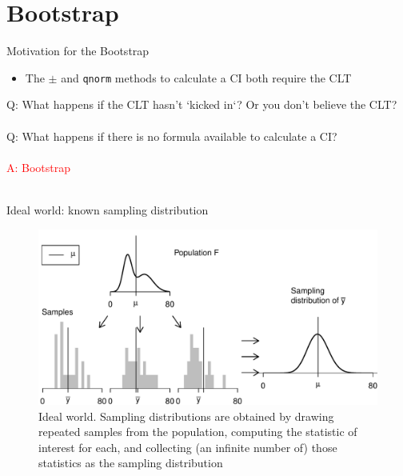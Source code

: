 \documentclass[10pt]{beamer}\usepackage[]{graphicx}\usepackage[]{color}
\makeatletter
\def\maxwidth{ %
  \ifdim\Gin@nat@width>\linewidth
    \linewidth
  \else
    \Gin@nat@width
  \fi
}
\newenvironment{knitrout}{}{} %
\makeatother
\begin{document}
\section{Bootstrap}

\begin{frame}{Motivation for the Bootstrap}
	\begin{itemize}
		\setlength\itemsep{2em}
		\item The $\pm$ and \texttt{qnorm} methods to calculate a CI both require the CLT
	\end{itemize}
	
	\pause
	
	\vspace*{0.2in}
	
	\Large \textcolor{myblue}{Q: What happens if the CLT hasn't `kicked in`? Or you don't believe the CLT?} \\ \ \\
	\pause 
	\Large \textcolor{myblue}{Q: What happens if there is no formula available to calculate a CI?} \\ \ \\
	\pause 
	\Large \textcolor{red}{A: Bootstrap} \\ \ \\
\end{frame}



\begin{frame}[fragile]{Ideal world: known sampling distribution}
	
\begin{knitrout}\tiny
{}\color{fgcolor}\begin{figure}

{\centering \includegraphics[width=\maxwidth]{figure/unnamed-chunk-15-1} 

}

\caption{\scriptsize{Ideal world. Sampling distributions are obtained by drawing repeated samples from the population, computing the statistic of interest for each, and collecting (an infinite number of) those statistics as the sampling distribution}}\label{fig:unnamed-chunk-15}
\end{figure}


\end{knitrout}
	
\end{frame}
\end{document}
